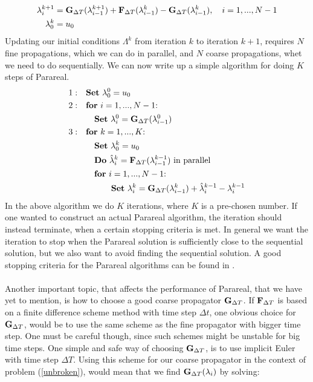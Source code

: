 \begin{align}
\lambda_{i}^{k+1} &= \bold G_ {\Delta T}(\lambda_{i-1}^{k+1})+\bold F_ {\Delta T}( \lambda_{i-1}^{k})-\bold G_ {\Delta T}( \lambda_{i-1}^{k}), \quad i=1,...,N-1 \label{pred_corr_PR} \\
\lambda_0^k &= u_0
\end{align}
Updating our initial conditions $\Lambda^k$ from iteration $k$ to iteration $k+1$, requires $N$ fine propagations, which we can do in parallel, and $N$ coarse propagations, whet we need to do sequentially. We can now write up a simple algorithm for doing $K$ steps of Parareal.
\begin{align*}
1:\quad&\textrm{$\bold{Set}$ $\lambda_0^0=u_0$} \\
2:\quad&\textrm{$\bold{for}$ $i=1,...,N-1$:} \\
&\quad\bold{Set} \ \lambda_i^0=\bold G_ {\Delta T}(\lambda_{i-1}^0) \\
3:\quad&\textrm{$\bold{for}$ $k=1,...,K$:} \\
&\quad\textrm{$\bold{Set}$ $\lambda_0^k=u_0$} \\
&\quad\textrm{$\bold{Do}$ $\hat \lambda_i^k=\bold F_ {\Delta T}( \lambda_{i-1}^{k-1})$ in parallel} \\
&\quad\textrm{$\bold{for}$ $i=1,...,N-1$:} \\
&\quad \quad \quad \bold{Set} \ \lambda_{i}^{k} = \bold G_ {\Delta T}(\lambda_{i-1}^{k})+\hat\lambda_i^{k-1}-\lambda_i^{k-1}
\end{align*}
In the above algorithm we do $K$ iterations, where $K$ is a pre-chosen number. If one wanted to construct an actual Parareal algorithm, the iteration should instead terminate, when a certain stopping criteria is met. In general we want the iteration to stop when the Parareal solution is sufficiently close to the sequential solution, but we also want to avoid finding the sequential solution. A good stopping criteria for the Parareal algorithms can be found in \cite{lepsa2010efficient}.
\\
\\
Another important topic, that affects the performance of Parareal, that we have yet to mention, is how to choose a good coarse propagator $\bold G_{\Delta T}$. If $\bold F_{\Delta T}$ is based on a finite difference scheme method with time step $\Delta t$, one obvious choice for $\bold G_{\Delta T}$, would be to use the same scheme as the fine propagator with bigger time step. One must be careful though, since such schemes might be unstable for big time steps. One simple and safe way of choosing $\bold G_{\Delta T}$, is to use implicit Euler with time step $\Delta T$. Using this scheme for our coarse propagator in the context of problem (\ref{unbroken}), would mean that we find $\bold{G}_{\Delta T}(\lambda_i)$ by solving:
